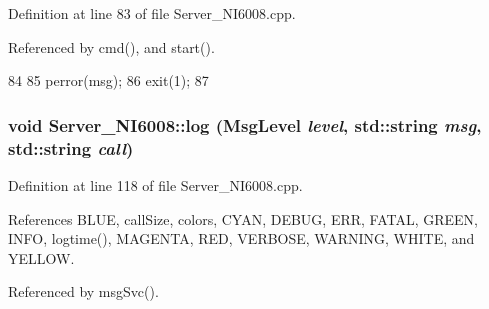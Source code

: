 Definition at line 83 of file Server\_\-NI6008.cpp.

Referenced by cmd(), and start().


\begin{DoxyCode}
84 {
85     perror(msg);
86     exit(1);
87 }
\end{DoxyCode}
\hypertarget{classServer__NI6008_ab83d0f144d5bb34f3a22aabef37de440}{
\subsubsection[{log}]{\setlength{\rightskip}{0pt plus 5cm}void Server\_\-NI6008::log ({\bf MsgLevel} {\em level}, \/  std::string {\em msg}, \/  std::string {\em call})}}
\label{classServer__NI6008_ab83d0f144d5bb34f3a22aabef37de440}


Definition at line 118 of file Server\_\-NI6008.cpp.

References BLUE, callSize, colors, CYAN, DEBUG, ERR, FATAL, GREEN, INFO, logtime(), MAGENTA, RED, VERBOSE, WARNING, WHITE, and YELLOW.

Referenced by msgSvc().


